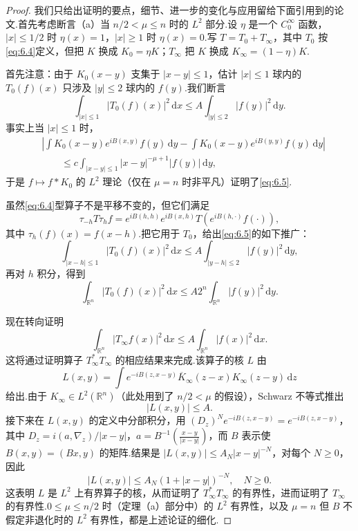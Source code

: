 \documentclass[
  BookTitleCN={傅里叶分析中的振动积分},
  BookTitleEN={Oscillatory Integrals in Fourier Analysis},
  OriginalAuthor={E.~M. Stein},
  OriginalEdition={Proc. Sympos. Pure Math. 35, Part~1},
  OriginalPublisher={American Mathematical Society},
  OriginalYear={1979},
  Translator={翻译及重排},
  ModelUsed={Codex CLI},
  Biblatex=false,
  TranslationDate={2026年8月27日}
]{mathtranslation}
\numberwithin{equation}{chapter}   %
\newcommand{\R}{\mathbb{R}}
\begin{document}
\begin{proof}
  我们只给出证明的要点，细节、进一步的变化与应用留给下面引用到的论文.首先考虑断言（a）当 $n/2<\mu\leq n$ 时的 $L^{2}$ 部分.设 $\eta$ 是一个 $C_0^\infty$ 函数，$|x|\leq1/2$ 时 $\eta(x)=1$，$|x|\geq1$ 时 $\eta(x)=0$.写 $T=T_{0}+T_{\infty}$，其中 $T_{0}$ 按\eqref{eq:6.4}定义，但把 $K$ 换成 $K_{0}=\eta K$；$T_{\infty}$ 把 $K$ 换成 $K_{\infty}=(1-\eta)K$.

  首先注意：由于 $K_{0}(x-y)$ 支集于 $|x-y|\leq1$，估计 $|x|\leq1$ 球内的 $T_{0}(f)(x)$ 只涉及 $|y|\leq2$ 球内的 $f(y)$.我们断言
  \begin{equation}
    \int_{|x|\leq1}|T_{0}(f)(x)|^{2}\,\mathrm{d}x\leq A\int_{|y|\leq2}|f(y)|^{2}\,\mathrm{d}y . \label{eq:6.5}
  \end{equation}
  事实上当 $|x|\leq1$ 时，
  \[
    \begin{split}
      &\left|\int K_{0}(x-y)e^{iB(x,y)}f(y)\,\mathrm{d}y-\int K_{0}(x-y)e^{iB(y,y)}f(y)\,\mathrm{d}y\right|\\
      &\qquad\leq c\int_{|x-y|\leq1}|x-y|^{-\mu+1}|f(y)|\,\mathrm{d}y,
    \end{split}
  \]
  于是 $f\mapsto f*K_{0}$ 的 $L^{2}$ 理论（仅在 $\mu=n$ 时非平凡）证明了\eqref{eq:6.5}.

  虽然\eqref{eq:6.4}型算子不是平移不变的，但它们满足
  \begin{equation}
    \tau_{-h}T\tau_{h}f=e^{iB(h,h)}e^{iB(x,h)}T(e^{iB(h,\cdot)}f(\cdot)), \label{eq:6.6}
  \end{equation}
  其中 $\tau_{h}(f)(x)=f(x-h)$.把它用于 $T_{0}$，给出\eqref{eq:6.5}的如下推广：
  \[
    \int_{|x-h|\leq1}|T_{0}(f)(x)|^{2}\,\mathrm{d}x\leq A\int_{|y-h|\leq2}|f(y)|^{2}\,\mathrm{d}y,
  \]
  再对 $h$ 积分，得到
  \[
    \int_{\R^{n}}|T_{0}(f)(x)|^{2}\,\mathrm{d}x\leq A2^{n}\int_{\R^{n}}|f(y)|^{2}\,\mathrm{d}y .
  \]

  现在转向证明
  \[
    \int_{\R^{n}}|T_{\infty}f(x)|^{2}\,\mathrm{d}x\leq A\int_{\R^{n}}|f(x)|^{2}\,\mathrm{d}x .
  \]
  这将通过证明算子 $T_{\infty}^{*}T_{\infty}$ 的相应结果来完成.该算子的核 $L$ 由
  \[
    L(x,y)=\int e^{-iB(z,x-y)}\overline{K}_{\infty}(z-x)K_{\infty}(z-y)\,\mathrm{d}z
  \]
  给出.由于 $K_{\infty}\in L^{2}(\R^{n})$（此处用到了 $n/2<\mu$ 的假设），Schwarz 不等式推出
  \[
    |L(x,y)|\leq A .
  \]
  接下来在 $L(x,y)$ 的定义中分部积分，用 $(D_{z})^{N}e^{-iB(z,x-y)}=e^{-iB(z,x-y)}$，其中 $D_{z}=i(a,\nabla_{z})/|x-y|$，$a=B^{-1}\left(\frac{x-y}{|x-y|}\right)$，而 $B$ 表示使 $B(x,y)=(Bx,y)$ 的矩阵.结果是 $|L(x,y)|\leq A_{N}|x-y|^{-N}$，对每个 $N\geq0$，因此
  \begin{equation}
    |L(x,y)|\leq A_{N}(1+|x-y|)^{-N},\quad N\geq0 . \label{eq:6.7}
  \end{equation}
  这表明 $L$ 是 $L^{2}$ 上有界算子的核，从而证明了 $T_{\infty}^{*}T_{\infty}$ 的有界性，进而证明了 $T_{\infty}$ 的有界性.$0\leq\mu\leq n/2$ 时（定理（a）部分中）的 $L^{2}$ 有界性，以及 $\mu=n$ 但 $B$ 不假定非退化时的 $L^{2}$ 有界性，都是上述论证的细化.


\end{proof}
\end{document}
